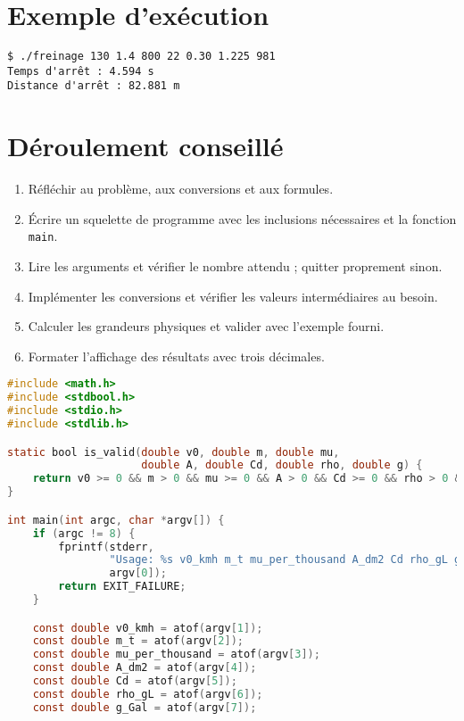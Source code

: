 \documentclass[french,a4paper,addpoints,11pt]{exam}
\begin{document}
\begin{questions}
        \section*{Exemple d'exécution}

        \begin{verbatim}
$ ./freinage 130 1.4 800 22 0.30 1.225 981
Temps d'arrêt : 4.594 s
Distance d'arrêt : 82.881 m
        \end{verbatim}

        \section*{Déroulement conseillé}
        \begin{enumerate}
            \item Réfléchir au problème, aux conversions et aux formules.
            \item Écrire un squelette de programme avec les inclusions nécessaires et la fonction \texttt{main}.
            \item Lire les arguments et vérifier le nombre attendu ; quitter proprement sinon.
            \item Implémenter les conversions et vérifier les valeurs intermédiaires au besoin.
            \item Calculer les grandeurs physiques et valider avec l'exemple fourni.
            \item Formater l'affichage des résultats avec trois décimales.
        \end{enumerate}

        \begin{solution}
\begin{lstlisting}[language=C]
#include <math.h>
#include <stdbool.h>
#include <stdio.h>
#include <stdlib.h>

static bool is_valid(double v0, double m, double mu,
                     double A, double Cd, double rho, double g) {
    return v0 >= 0 && m > 0 && mu >= 0 && A > 0 && Cd >= 0 && rho > 0 && g > 0;
}

int main(int argc, char *argv[]) {
    if (argc != 8) {
        fprintf(stderr,
                "Usage: %s v0_kmh m_t mu_per_thousand A_dm2 Cd rho_gL g_Gal\n",
                argv[0]);
        return EXIT_FAILURE;
    }

    const double v0_kmh = atof(argv[1]);
    const double m_t = atof(argv[2]);
    const double mu_per_thousand = atof(argv[3]);
    const double A_dm2 = atof(argv[4]);
    const double Cd = atof(argv[5]);
    const double rho_gL = atof(argv[6]);
    const double g_Gal = atof(argv[7]);


\end{lstlisting}
\end{solution}
\end{questions}
\end{document}
